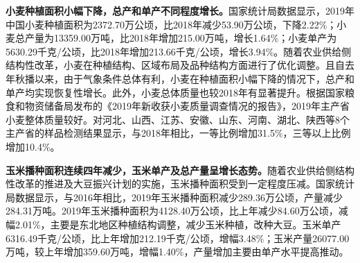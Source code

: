 \documentclass{progbookcn}
\begin{document}
\textbf{小麦种植面积小幅下降，总产和单产不同程度增长。}国家统计局数据显示，2019年中国小麦种植面积为2372.70万公顷，比2018年减少53.90万公顷，下降2.22\%；小麦总产量为13359.00万吨，比2018年增加215.00万吨，增长1.64\%；小麦单产为5630.29千克/公顷，比2018年增加213.66千克/公顷，增长3.94\%。随着农业供给侧结构性改革，小麦在种植结构、区域布局及品种结构方面进行了优化调整。且自去年秋播以来，由于气象条件总体有利，小麦在种植面积小幅下降的情况下，总产和单产均实现恢复性增长。此外，小麦总体质量也较2018年有显著提升。根据国家粮食和物资储备局发布的《2019年新收获小麦质量调查情况的报告》，2019年主产省小麦整体质量较好。对河北、山西、江苏、安徽、山东、河南、湖北、陕西等8个主产省的样品检测结果显示，与2018年相比，一等比例增加31.5\%，三等以上比例增加10.4\%。

\textbf{玉米播种面积连续四年减少，玉米单产及总产量呈增长态势。}随着农业供给侧结构性改革的推进及大豆振兴计划的实施，玉米播种面积受到一定程度压减。国家统计局数据显示，与2016年相比，2019年玉米播种面积减少289.36万公顷，产量减少284.31万吨。2019年玉米播种面积为4128.40万公顷，比上年减少84.60万公顷，减幅2.01\%，主要是东北地区种植结构调整，减少玉米种植，改种大豆。玉米单产6316.49千克/公顷，比上年增加212.19千克/公顷，增幅3.48\%；玉米产量26077.00万吨，较上年增加359.60万吨，增幅1.40\%，产量增加主要由单产水平提高推动。

\begin{table}[]
\centering
{}
\end{table}
\end{document}
